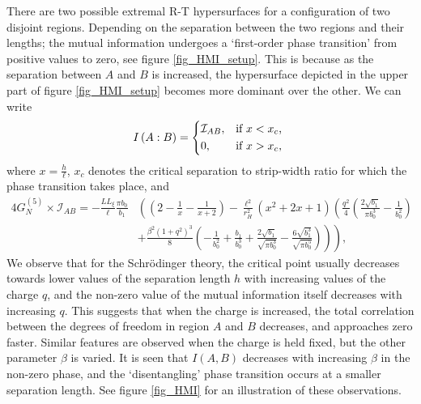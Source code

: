 \documentclass[12pt,a4paper]{article}
\numberwithin{equation}{section}
\begin{document}
There are two possible extremal R-T hypersurfaces for a configuration of two disjoint regions. Depending on the separation between the two regions and their lengths; the mutual information undergoes a `first-order phase transition' from positive values to zero, see figure \ref{fig_HMI_setup}. This is because as the separation between $A$ and $B$ is increased, the hypersurface depicted in the upper part of figure \ref{fig_HMI_setup} becomes more dominant over the other. We can write
%
\begin{align} \label{MI_expression1}
	I\left(A:B\right) = \begin{dcases*}
		\mathcal{I}_{AB}, & if $ x < x_c $, \\
		0, & if $ x > x_c $,
	\end{dcases*}
\end{align}
%
where $x = \frac{h}{\ell}$, $x_c$ denotes the critical separation to strip-width ratio for which the phase transition takes place, and
%
\begin{equation}
\begin{split}
    4G_N^{(5)}\times\mathcal{I}_{AB} = -\frac{LL_{\xi}}{\ell}\frac{\pi b_0}{b_1} &\left(\left(2 - \frac{1}{x} - \frac{1}{x+2} \right) - \frac{\ell^2}{r_H^2} \left(x^2 + 2x + 1 \right) \left( \frac{q^2}{4} \left( \frac{2\sqrt{b_1}}{\pi b_0^3} - \frac{1}{b_0^2} \right) \right. \right. \\ &\left. \left. + \frac{\beta^2\left(1+q^2\right)^3}{8} \left(-\frac{1}{b_0^2} + \frac{b_1}{b_0^3} + \frac{2\sqrt{b_1}}{\sqrt{\pi b_0^3}} - \frac{6\sqrt{b_1^3}}{\sqrt{\pi b_0^5}} \right) \right) \right),
\end{split}
\end{equation}
%
We observe that for the Schr\"{o}dinger theory, the critical point usually decreases towards lower values of the separation length $h$ with increasing values of the charge $q$, and the non-zero value of the mutual information itself decreases with increasing $q$. This suggests that when the charge is increased, the total correlation between the degrees of freedom in region $A$ and $B$ decreases, and approaches zero faster. Similar features are observed when the charge is held fixed, but the other parameter $\beta$ is varied. It is seen that $I\left(A, B\right)$ decreases with increasing $\beta$ in the non-zero phase, and the `disentangling' phase transition occurs at a smaller separation length. See figure \ref{fig_HMI} for an illustration of these observations.
\end{document}
